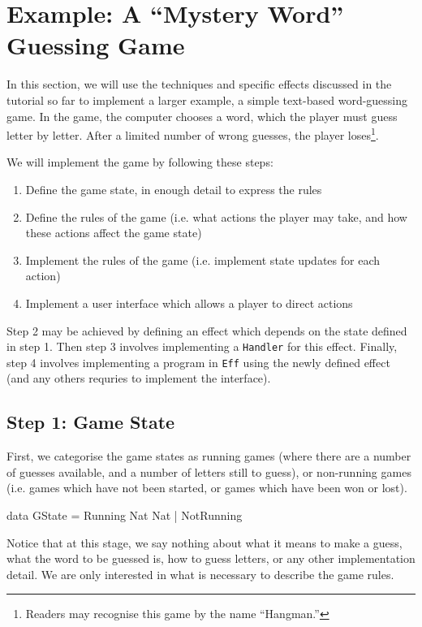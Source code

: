 \section{Example: A ``Mystery Word'' Guessing Game}

In this section, we will use the techniques and specific effects discussed
in the tutorial so far to implement a larger example, a simple text-based
word-guessing game. In the game, the computer chooses a word, which the
player must guess letter by letter. After a limited number of wrong
guesses, the player loses\footnote{Readers may recognise this game
by the name ``Hangman.''}.

We will implement the game by following these steps:

\begin{enumerate}
\item Define the game state, in enough detail to express the rules
\item Define the rules of the game (i.e. what actions the player may take, 
and how these actions affect the game state)
\item Implement the rules of the game (i.e. implement state updates for each 
action)
\item Implement a user interface which allows a player to direct actions
\end{enumerate}

\noindent
Step 2 may be achieved by defining an effect which depends on the state defined
in step 1. Then step 3 involves implementing a \texttt{Handler} for this effect.
Finally, step 4 involves implementing a program in \texttt{Eff} using the
newly defined effect (and any others requries to implement the interface).

\subsection{Step 1: Game State}

First, we categorise the game states as running games (where there are a 
number of guesses available, and a number of letters still to guess), or
non-running games (i.e. games which have not been started, or games which
have been won or lost).

\begin{code}
data GState = Running Nat Nat | NotRunning
\end{code}

\noindent
Notice that at this stage, we say nothing about what it means to make a guess,
what the word to be guessed is, how to guess letters, or any other implementation
detail. We are only interested in what is necessary to describe the game
rules.

